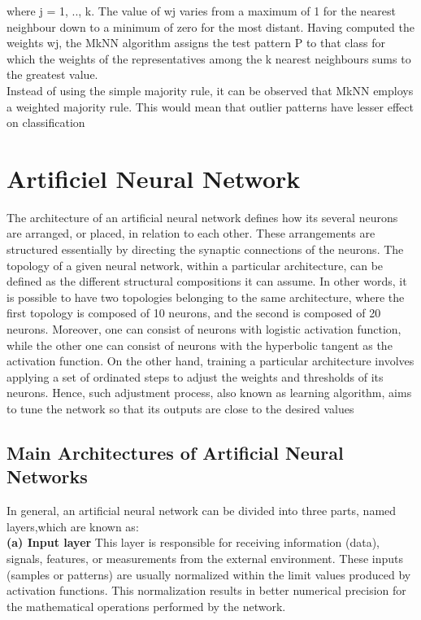 where j = 1, .., k. The value of wj varies from a maximum of 1 for the nearest
neighbour down to a minimum of zero for the most distant. Having computed the
weights wj, the MkNN algorithm assigns the test pattern P to that class for which the
weights of the representatives among the k nearest neighbours sums to the greatest
value.\\
Instead of using the simple majority rule, it can be observed that MkNN employs
a weighted majority rule. This would mean that outlier patterns have lesser effect on
classification

\section{Artificiel Neural Network}
The architecture of an artificial neural network defines how its several neurons are
arranged, or placed, in relation to each other. These arrangements are structured
essentially by directing the synaptic connections of the neurons.
The topology of a given neural network, within a particular architecture, can be
defined as the different structural compositions it can assume. In other words, it is
possible to have two topologies belonging to the same architecture, where the first
topology is composed of 10 neurons, and the second is composed of 20 neurons.
Moreover, one can consist of neurons with logistic activation function, while the
other one can consist of neurons with the hyperbolic tangent as the activation
function.
On the other hand, training a particular architecture involves applying a set of
ordinated steps to adjust the weights and thresholds of its neurons. Hence, such
adjustment process, also known as learning algorithm, aims to tune the network so
that its outputs are close to the desired values


\subsection{Main Architectures of Artificial Neural Networks}

In general, an artificial neural network can be divided into three parts, named layers,which are known as:\\

\textbf{(a) Input layer}
This layer is responsible for receiving information (data), signals, features, or measurements from the external environment. These inputs (samples or patterns) are usually normalized within the limit values produced by activation functions. This normalization results in better numerical precision for the mathematical operations performed by the network.\\

